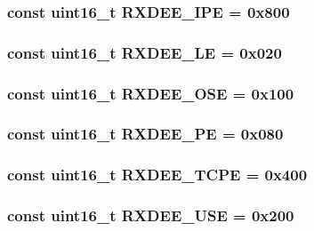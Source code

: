 \label{namespaceiGbReg_a3c7498480684ea5f18a6caff1489d9e1}
\hypertarget{namespaceiGbReg_a7c6e9391f043fae210dac66022ccb0db}{
\subsubsection[{RXDEE\_\-IPE}]{\setlength{\rightskip}{0pt plus 5cm}const uint16\_\-t {\bf RXDEE\_\-IPE} = 0x800}}
\label{namespaceiGbReg_a7c6e9391f043fae210dac66022ccb0db}
\hypertarget{namespaceiGbReg_a3dd2fffa1f4c31bd1267d65f74b0c7b2}{
\subsubsection[{RXDEE\_\-LE}]{\setlength{\rightskip}{0pt plus 5cm}const uint16\_\-t {\bf RXDEE\_\-LE} = 0x020}}
\label{namespaceiGbReg_a3dd2fffa1f4c31bd1267d65f74b0c7b2}
\hypertarget{namespaceiGbReg_a0a7430b12c397b22f981a44316185090}{
\subsubsection[{RXDEE\_\-OSE}]{\setlength{\rightskip}{0pt plus 5cm}const uint16\_\-t {\bf RXDEE\_\-OSE} = 0x100}}
\label{namespaceiGbReg_a0a7430b12c397b22f981a44316185090}
\hypertarget{namespaceiGbReg_a6d2898616d7a90b9fba5e4437946e9d6}{
\subsubsection[{RXDEE\_\-PE}]{\setlength{\rightskip}{0pt plus 5cm}const uint16\_\-t {\bf RXDEE\_\-PE} = 0x080}}
\label{namespaceiGbReg_a6d2898616d7a90b9fba5e4437946e9d6}
\hypertarget{namespaceiGbReg_a4ddfc8191736dc4c822f86ff1b073ea4}{
\subsubsection[{RXDEE\_\-TCPE}]{\setlength{\rightskip}{0pt plus 5cm}const uint16\_\-t {\bf RXDEE\_\-TCPE} = 0x400}}
\label{namespaceiGbReg_a4ddfc8191736dc4c822f86ff1b073ea4}
\hypertarget{namespaceiGbReg_a05f322eff2b257ab4460b1df5ae85d80}{
\subsubsection[{RXDEE\_\-USE}]{\setlength{\rightskip}{0pt plus 5cm}const uint16\_\-t {\bf RXDEE\_\-USE} = 0x200}}
